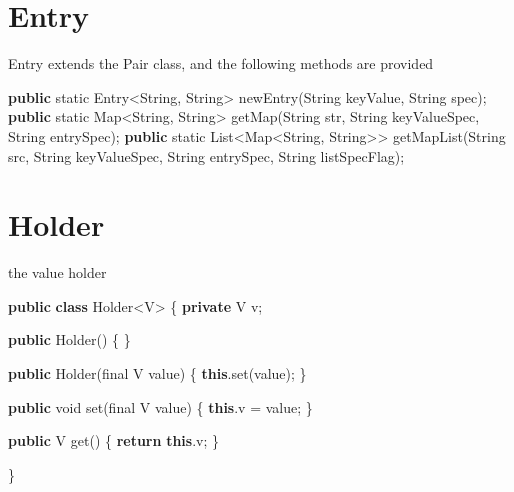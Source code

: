\documentclass[
]{book}
\newenvironment{Shaded}{\begin{snugshade}}{\end{snugshade}}
\newcommand{\BuiltInTok}[1]{#1}
\newcommand{\DataTypeTok}[1]{\textcolor[rgb]{0.13,0.29,0.53}{#1}}
\newcommand{\FunctionTok}[1]{\textcolor[rgb]{0.00,0.00,0.00}{#1}}
\newcommand{\KeywordTok}[1]{\textcolor[rgb]{0.13,0.29,0.53}{\textbf{#1}}}
\newcommand{\NormalTok}[1]{#1}
\begin{document}
\hypertarget{langx-java_references_struct_Entry}{%
\section{Entry}\label{langx-java_references_struct_Entry}}

Entry extends the Pair class, and the following methods are provided

\begin{Shaded}
\begin{Highlighting}[]
\KeywordTok{public} \DataTypeTok{static}\NormalTok{ Entry<}\BuiltInTok{String}\NormalTok{, }\BuiltInTok{String}\NormalTok{> }\FunctionTok{newEntry}\NormalTok{(}\BuiltInTok{String}\NormalTok{ keyValue, }\BuiltInTok{String}\NormalTok{ spec);}
\KeywordTok{public} \DataTypeTok{static} \BuiltInTok{Map}\NormalTok{<}\BuiltInTok{String}\NormalTok{, }\BuiltInTok{String}\NormalTok{> }\FunctionTok{getMap}\NormalTok{(}\BuiltInTok{String}\NormalTok{ str, }\BuiltInTok{String}\NormalTok{ keyValueSpec, }\BuiltInTok{String}\NormalTok{ entrySpec);}
\KeywordTok{public} \DataTypeTok{static} \BuiltInTok{List}\NormalTok{<}\BuiltInTok{Map}\NormalTok{<}\BuiltInTok{String}\NormalTok{, }\BuiltInTok{String}\NormalTok{>> }\FunctionTok{getMapList}\NormalTok{(}\BuiltInTok{String}\NormalTok{ src, }\BuiltInTok{String}\NormalTok{ keyValueSpec, }\BuiltInTok{String}\NormalTok{ entrySpec, }\BuiltInTok{String}\NormalTok{ listSpecFlag);}
\end{Highlighting}
\end{Shaded}

\hypertarget{langx-java_references_struct_Holder}{%
\section{Holder}\label{langx-java_references_struct_Holder}}

the value holder

\begin{Shaded}
\begin{Highlighting}[]
\KeywordTok{public} \KeywordTok{class} \BuiltInTok{Holder}\NormalTok{<V> \{}
    \KeywordTok{private}\NormalTok{ V v;}

    \KeywordTok{public} \BuiltInTok{Holder}\NormalTok{() \{}
\NormalTok{    \}}

    \KeywordTok{public} \BuiltInTok{Holder}\NormalTok{(}\DataTypeTok{final}\NormalTok{ V value) \{}
        \KeywordTok{this}\NormalTok{.}\FunctionTok{set}\NormalTok{(value);}
\NormalTok{    \}}

    \KeywordTok{public} \DataTypeTok{void} \FunctionTok{set}\NormalTok{(}\DataTypeTok{final}\NormalTok{ V value) \{}
        \KeywordTok{this}\NormalTok{.}\FunctionTok{v}\NormalTok{ = value;}
\NormalTok{    \}}

    \KeywordTok{public}\NormalTok{ V }\FunctionTok{get}\NormalTok{() \{}
        \KeywordTok{return} \KeywordTok{this}\NormalTok{.}\FunctionTok{v}\NormalTok{;}
\NormalTok{    \}}

\NormalTok{\}}

\end{Highlighting}
\end{Shaded}
\end{document}
